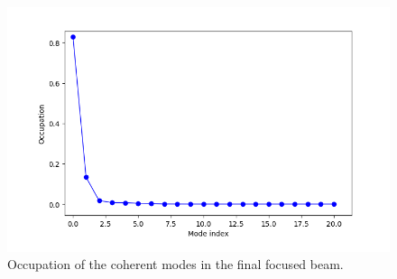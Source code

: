 \documentclass{iucr}              %
\begin{document}
  

\begin{figure}\label{fig:rediagonalization}
    \centering
        \includegraphics[width=\textwidth]{GRAPHICS/rediagonalization.png}
    
    \caption{Occupation of the coherent modes in the final focused beam.}
\end{figure}
\end{document}
